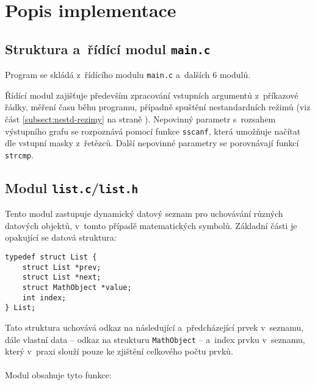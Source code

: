 \documentclass[pdftex,a4paper]{article}
\begin{document}
\newpage
\section{Popis implementace}

\subsection{Struktura a~řídící modul \texttt{main.c}}
Program se skládá z~řídícího modulu \texttt{main.c} a~dalších 6 modulů.

Řídící modul zajišťuje především zpracování vstupních argumentů z~příkazové řádky, měření času běhu programu, případně spuštění nestandardních režimů (viz část \ref{subsect:nestd-rezimy} na straně \pageref{subsect:nestd-rezimy}). Nepovinný parametr s~rozsahem výstupního grafu se rozpoznává pomocí funkce \texttt{sscanf}, která umožňuje načítat dle vstupní masky z~řetězců. Další nepovinné parametry se porovnávají funkcí \texttt{strcmp}.

\subsection{Modul \texttt{list.c}/\texttt{list.h}}
Tento modul zastupuje dynamický datový seznam pro uchovávání různých datových objektů, v~tomto případě matematických symbolů. Základní části je opakující se datová struktura:

\begin{lstlisting}
typedef struct List {
    struct List *prev;
    struct List *next;  
    struct MathObject *value;
    int index;
} List;
\end{lstlisting}
%
Tato struktura uchovává odkaz na následující a~předcházející prvek v~seznamu, dále vlastní data -- odkaz na strukturu \texttt{MathObject} -- a~index prvku v~seznamu, který v~praxi slouží pouze ke zjištění celkového počtu prvků.
\\\\
Modul obsahuje tyto funkce:
\end{document}
